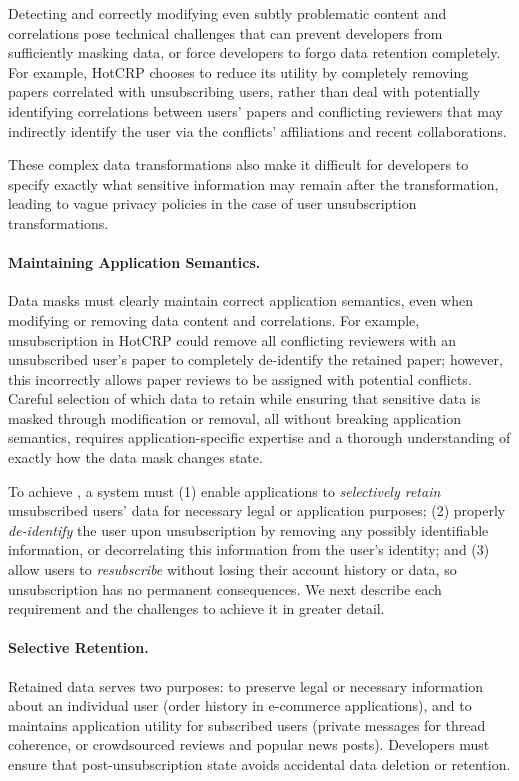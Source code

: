 Detecting and correctly modifying even subtly problematic content and correlations pose technical
challenges that can prevent developers from sufficiently masking data, or force developers
to forgo data retention completely. For example, HotCRP chooses to reduce its utility by completely
removing papers correlated with unsubscribing users, rather than deal with potentially identifying
correlations between users' papers and conflicting reviewers that may indirectly identify the user
via the conflicts' affiliations and recent collaborations. 

These complex data transformations also make it difficult for developers to specify exactly what
sensitive information may remain after the transformation, leading to \eg vague privacy policies in
the case of user unsubscription transformations.

\paragraph{Maintaining Application Semantics.}
Data masks must clearly maintain correct application semantics, even when modifying or removing data
content and correlations. For example, unsubscription in HotCRP could remove all
conflicting reviewers with an unsubscribed user's paper to completely de-identify the retained
paper; however, this incorrectly allows paper reviews to be assigned with potential conflicts.
Careful selection of which data to retain while ensuring that sensitive data is masked through
modification or removal, all without breaking application semantics, requires application-specific
expertise and a thorough understanding of exactly how the data mask changes state.

\iffalse
To achieve \name, a system must (1) enable applications to \emph{selectively retain} unsubscribed
users' data for necessary legal or application purposes; (2) properly \emph{de-identify} the user
upon unsubscription by removing any possibly identifiable information, or decorrelating this
information from the user's identity; and (3) allow users to \emph{resubscribe} without losing their
account history or data, so unsubscription has no permanent consequences. We next describe each
requirement and the challenges to achieve it in greater detail.

\paragraph{Selective Retention.}
Retained data serves two purposes: to preserve legal or
necessary information about an individual user (\eg order history in e-commerce applications), and
to maintains application utility for subscribed users (\eg private messages
for thread coherence, or crowdsourced reviews and popular news posts).
Developers must ensure that post-unsubscription state avoids accidental data deletion or retention.

